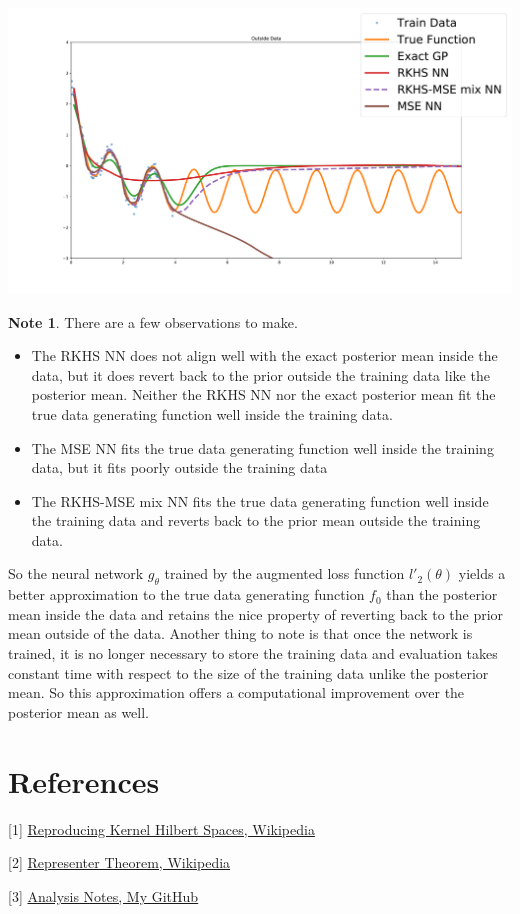 \documentclass{article}
\theoremstyle{definition}
\newtheorem{note}[definition]{Note}
\begin{document}
\includegraphics[scale=.35]{outside_data.pdf}

\begin{note}
There are a few observations to make. 
\begin{itemize}
\item The RKHS NN does not align well with the exact posterior mean inside the data, but it does revert back to the prior outside the training data like the posterior mean. Neither the RKHS NN nor the exact posterior mean fit the true data generating function well inside the training data.
\item The MSE NN fits the true data generating function well inside the training data, but it fits poorly outside the training data  
\item The RKHS-MSE mix NN fits the true data generating function well inside the training data and reverts back to the prior mean outside the training data.
\end{itemize}

So the neural network $g_{\theta}$ trained by the augmented loss function $l'_2(\theta)$ yields a better approximation to the true data generating function $f_0$ than the posterior mean inside the data and retains the nice property of reverting back to the prior mean outside of the data. Another thing to note is that once the network is trained, it is no longer necessary to store the training data and evaluation takes constant time with respect to the size of the training data unlike the posterior mean. So this approximation offers a computational improvement over the posterior mean as well.
\end{note}






\section*{References}



[1] \href{https://en.wikipedia.org/wiki/Reproducing_kernel_Hilbert_space}{Reproducing Kernel Hilbert Spaces, Wikipedia}

[2] \href{https://en.wikipedia.org/wiki/Representer_theorem}{Representer Theorem, Wikipedia}

[3] \href{https://github.com/carsonaj/Mathematics/blob/master/Introduction\%20to\%20Analysis/Introduction\%20to\%20Analysis.pdf}{Analysis Notes, My GitHub}
\end{document}

